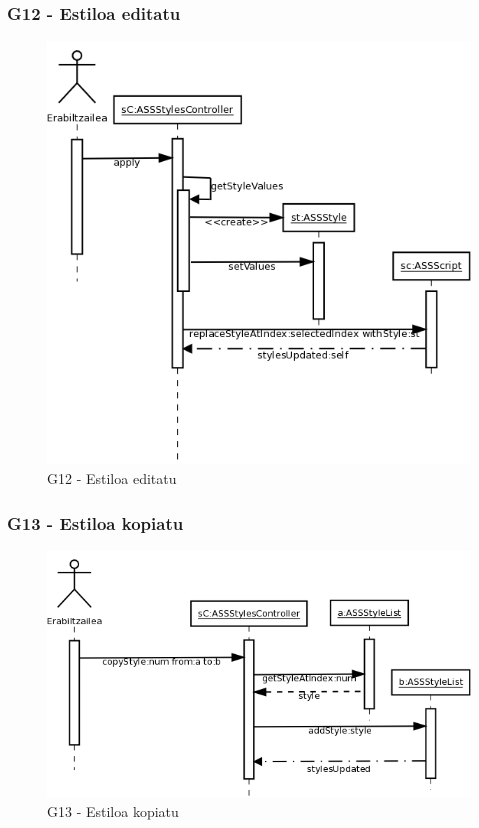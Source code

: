 \subsubsection{G12 - Estiloa editatu}
\begin{figure}[htp]
\begin{center}
\includegraphics[scale=0.3]{Pictures/Chapter4/Diseinua/G12.png}
\caption{G12 - Estiloa editatu}
\label{g12d}
\end{center}
\end{figure}

\subsubsection{G13 - Estiloa kopiatu}
\begin{figure}[htp]
\begin{center}
\includegraphics[scale=0.35]{Pictures/Chapter4/Diseinua/G13.png}
\caption{G13 - Estiloa kopiatu}
\label{g13d}
\end{center}
\end{figure}

